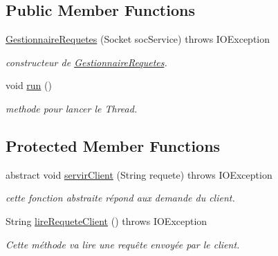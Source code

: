 \subsection*{Public Member Functions}
\begin{DoxyCompactItemize}
\item 
\hyperlink{classgestionnaireRequete_1_1GestionnaireRequetes_a30364d904d0ab798250e1f7a0a7e9465}{Gestionnaire\+Requetes} (Socket soc\+Service)  throws I\+O\+Exception 
\begin{DoxyCompactList}\small\item\em constructeur de \hyperlink{classgestionnaireRequete_1_1GestionnaireRequetes}{Gestionnaire\+Requetes}. \end{DoxyCompactList}\item 
\mbox{\label{classgestionnaireRequete_1_1GestionnaireRequetes_a2bdb6af7bf6fc711b4565890899b8b6d}} 
void \hyperlink{classgestionnaireRequete_1_1GestionnaireRequetes_a2bdb6af7bf6fc711b4565890899b8b6d}{run} ()
\begin{DoxyCompactList}\small\item\em methode pour lancer le Thread. \end{DoxyCompactList}\end{DoxyCompactItemize}
\subsection*{Protected Member Functions}
\begin{DoxyCompactItemize}
\item 
abstract void \hyperlink{classgestionnaireRequete_1_1GestionnaireRequetes_a703068945b171f22015fb5cc1f880190}{servir\+Client} (String requete)  throws I\+O\+Exception
\begin{DoxyCompactList}\small\item\em cette fonction abstraite répond aux demande du client. \end{DoxyCompactList}\item 
String \hyperlink{classgestionnaireRequete_1_1GestionnaireRequetes_a71eceb6b3b7236615f117e0ddf75896c}{lire\+Requete\+Client} ()  throws I\+O\+Exception 
\begin{DoxyCompactList}\small\item\em Cette méthode va lire une requête envoyée par le client. \end{DoxyCompactList}\end{DoxyCompactItemize}
